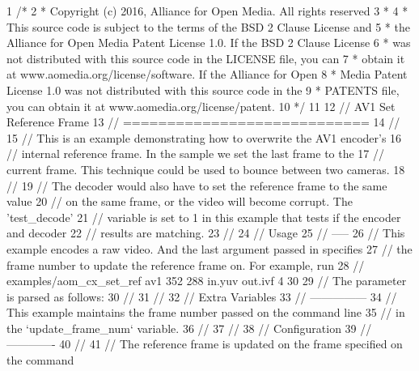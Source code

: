 \begin{DoxyCodeInclude}
1 \textcolor{comment}{/*}
2 \textcolor{comment}{ * Copyright (c) 2016, Alliance for Open Media. All rights reserved}
3 \textcolor{comment}{ *}
4 \textcolor{comment}{ * This source code is subject to the terms of the BSD 2 Clause License and}
5 \textcolor{comment}{ * the Alliance for Open Media Patent License 1.0. If the BSD 2 Clause License}
6 \textcolor{comment}{ * was not distributed with this source code in the LICENSE file, you can}
7 \textcolor{comment}{ * obtain it at www.aomedia.org/license/software. If the Alliance for Open}
8 \textcolor{comment}{ * Media Patent License 1.0 was not distributed with this source code in the}
9 \textcolor{comment}{ * PATENTS file, you can obtain it at www.aomedia.org/license/patent.}
10 \textcolor{comment}{ */}
11 
12 \textcolor{comment}{// AV1 Set Reference Frame}
13 \textcolor{comment}{// ============================}
14 \textcolor{comment}{//}
15 \textcolor{comment}{// This is an example demonstrating how to overwrite the AV1 encoder's}
16 \textcolor{comment}{// internal reference frame. In the sample we set the last frame to the}
17 \textcolor{comment}{// current frame. This technique could be used to bounce between two cameras.}
18 \textcolor{comment}{//}
19 \textcolor{comment}{// The decoder would also have to set the reference frame to the same value}
20 \textcolor{comment}{// on the same frame, or the video will become corrupt. The 'test\_decode'}
21 \textcolor{comment}{// variable is set to 1 in this example that tests if the encoder and decoder}
22 \textcolor{comment}{// results are matching.}
23 \textcolor{comment}{//}
24 \textcolor{comment}{// Usage}
25 \textcolor{comment}{// -----}
26 \textcolor{comment}{// This example encodes a raw video. And the last argument passed in specifies}
27 \textcolor{comment}{// the frame number to update the reference frame on. For example, run}
28 \textcolor{comment}{// examples/aom\_cx\_set\_ref av1 352 288 in.yuv out.ivf 4 30}
29 \textcolor{comment}{// The parameter is parsed as follows:}
30 \textcolor{comment}{//}
31 \textcolor{comment}{//}
32 \textcolor{comment}{// Extra Variables}
33 \textcolor{comment}{// ---------------}
34 \textcolor{comment}{// This example maintains the frame number passed on the command line}
35 \textcolor{comment}{// in the `update\_frame\_num` variable.}
36 \textcolor{comment}{//}
37 \textcolor{comment}{//}
38 \textcolor{comment}{// Configuration}
39 \textcolor{comment}{// -------------}
40 \textcolor{comment}{//}
41 \textcolor{comment}{// The reference frame is updated on the frame specified on the command}

\end{DoxyCodeInclude}
